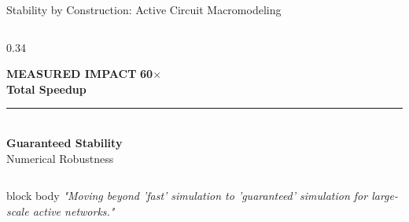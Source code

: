 \begin{frame}[t]{Stability by Construction: Active Circuit Macromodeling}
\begin{columns}[T, onlytextwidth]
		\begin{column}{0.34\textwidth}
			\begin{alertblock}{\centering \textbf{MEASURED IMPACT}}
				\centering
				\vspace{1ex}
				{\huge \textbf{60$\times$}} \\
				\footnotesize \textbf{Total Speedup} \\
				\vspace{1.5ex}
				\textcolor{red!20}{\rule{0.8\textwidth}{0.5pt}} \\
				\vspace{1.5ex}
				\small \textbf{Guaranteed Stability} \\
				\footnotesize Numerical Robustness
				\vspace{1ex}
			\end{alertblock}
		\end{column}
	\end{columns}

	\vfill
	\begin{beamercolorbox}[wd=\textwidth, sep=1.2ex, center, rounded=true]{block body}
		\small \itshape \textcolor{blue!80!black}{"Moving beyond 'fast' simulation to 'guaranteed' simulation for large-scale active networks."}
	\end{beamercolorbox}
\end{frame}

